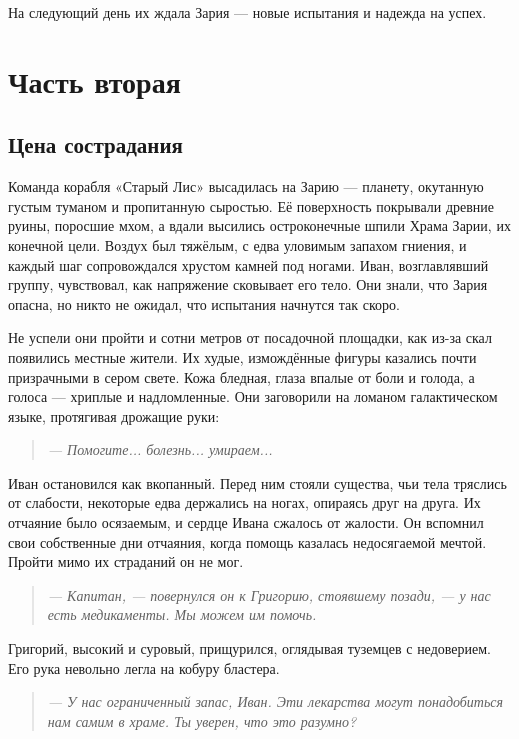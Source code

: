 \documentclass[12pt,a4paper]{book}
\newenvironment{dialogue}{\begin{quote}\itshape}{\end{quote}}
\begin{document}
На следующий день их ждала Зария --- новые испытания и надежда на успех.

\part{Часть вторая}

\chapter{Цена сострадания}

Команда корабля «Старый Лис» высадилась на Зарию --- планету, окутанную густым туманом и пропитанную сыростью. Её поверхность покрывали древние руины, поросшие мхом, а вдали высились остроконечные шпили Храма Зарии, их конечной цели. Воздух был тяжёлым, с едва уловимым запахом гниения, и каждый шаг сопровождался хрустом камней под ногами. Иван, возглавлявший группу, чувствовал, как напряжение сковывает его тело. Они знали, что Зария опасна, но никто не ожидал, что испытания начнутся так скоро.

Не успели они пройти и сотни метров от посадочной площадки, как из-за скал появились местные жители. Их худые, измождённые фигуры казались почти призрачными в сером свете. Кожа бледная, глаза впалые от боли и голода, а голоса --- хриплые и надломленные. Они заговорили на ломаном галактическом языке, протягивая дрожащие руки:

\begin{dialogue}
--- Помогите... болезнь... умираем...
\end{dialogue}

Иван остановился как вкопанный. Перед ним стояли существа, чьи тела тряслись от слабости, некоторые едва держались на ногах, опираясь друг на друга. Их отчаяние было осязаемым, и сердце Ивана сжалось от жалости. Он вспомнил свои собственные дни отчаяния, когда помощь казалась недосягаемой мечтой. Пройти мимо их страданий он не мог.

\begin{dialogue}
--- Капитан, --- повернулся он к Григорию, стоявшему позади, --- у нас есть медикаменты. Мы можем им помочь.
\end{dialogue}

Григорий, высокий и суровый, прищурился, оглядывая туземцев с недоверием. Его рука невольно легла на кобуру бластера.

\begin{dialogue}
--- У нас ограниченный запас, Иван. Эти лекарства могут понадобиться нам самим в храме. Ты уверен, что это разумно?
\end{dialogue}
\end{document}
